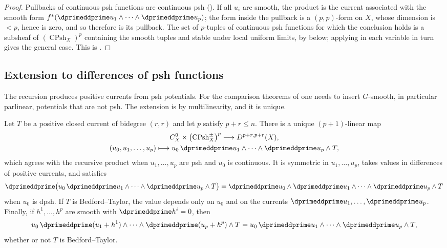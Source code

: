 \begin{proof}
Pullbacks of continuous psh functions are continuous psh
().  If all $u_i$ are smooth, the product is the
current associated with the smooth form
$f^*(\dprimeddprime u_1\wedge\cdots\wedge\dprimeddprime u_p)$; the form
inside the pullback is a $(p,p)$-form on $X$, whose dimension is $<p$, hence
is zero, and so therefore is its pullback.  The set
of $p$-tuples of continuous psh functions for which the conclusion holds is
a subsheaf of $(\operatorname{CPsh}_X)^p$ containing the smooth tuples and
stable under local uniform limits, by
 below; applying
 in each variable in turn gives the general
case.  This is \cite[Remark~8.8.9]{CLD25}.
\end{proof}

\subsection{Extension to differences of psh functions}
\label{sec:ch16-dpsh-extension}

The recursion produces positive currents from psh potentials.  For the
comparison theorems of  one needs to insert
$G$-smooth, in particular parlinear, potentials that are not psh.  The
extension is by multilinearity, and it is unique.

\begin{theorem}
\label{thm:ch16-dpsh-product}
Let $T$ be a positive closed current of bidegree $(r,r)$ and let $p$ satisfy
$p+r\leq n$.  There is a unique $(p+1)$-linear map
\[
\begin{gathered}
 C^0_X\times\bigl(\operatorname{CPsh}^\pm_X\bigr)^p
 \longrightarrow
 D^{p+r,p+r}(X),\\
 (u_0,u_1,\ldots,u_p)\longmapsto
   u_0\,\dprimeddprime u_1\wedge\cdots\wedge\dprimeddprime u_p\wedge T,
\end{gathered}
\]
which agrees with the recursive product when $u_1,\ldots,u_p$ are psh and
$u_0$ is continuous.  It is symmetric in $u_1,\ldots,u_p$, takes values in
differences of positive currents, and satisfies
\begin{equation}
\label{eq:ch16-dpsh-outer}
 \dprimeddprime\bigl(u_0\,\dprimeddprime u_1\wedge\cdots
   \wedge\dprimeddprime u_p\wedge T\bigr)
 =\dprimeddprime u_0\wedge\dprimeddprime u_1\wedge\cdots
   \wedge\dprimeddprime u_p\wedge T
\end{equation}
when $u_0$ is dpsh.  If $T$ is Bedford--Taylor, the value depends only on
$u_0$ and on the currents $\dprimeddprime u_1,\ldots,\dprimeddprime u_p$.
Finally, if $h^1,\ldots,h^p$ are smooth with $\dprimeddprime h^i=0$, then
\begin{equation}
\label{eq:ch16-harmonic-quotient}
 u_0\,\dprimeddprime(u_1+h^1)\wedge\cdots
    \wedge\dprimeddprime(u_p+h^p)\wedge T
 =u_0\,\dprimeddprime u_1\wedge\cdots
    \wedge\dprimeddprime u_p\wedge T ,
\end{equation}
whether or not $T$ is Bedford--Taylor.
\end{theorem}

